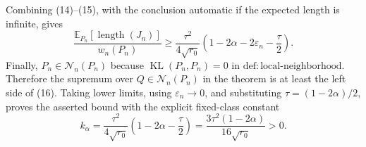Combining (14)--(15), with the conclusion automatic if the expected length is infinite, gives
\[
\frac{\mathbb E_{P_n}[\operatorname{length}(J_n)]}{w_n(P_n)}
\geq
\frac{\tau^2}{4\sqrt{r_0}}
\left(1-2\alpha-2\varepsilon_n-\frac\tau2\right). \tag{16}
\]
Finally, \(P_n\in\mathcal N_n(P_n)\) because \(\operatorname{KL}(P_n,P_n)=0\) in \(\mathrm{def{:}local\mbox{-}neighborhood}\).  Therefore the supremum over \(Q\in\mathcal N_n(P_n)\) in the theorem is at least the left side of (16).  Taking lower limits, using \(\varepsilon_n\to0\), and substituting \(\tau=(1-2\alpha)/2\), proves the asserted bound with the explicit fixed-class constant
\[
k_\alpha
=\frac{\tau^2}{4\sqrt{r_0}}
\left(1-2\alpha-\frac\tau2\right)
=\frac{3\tau^2(1-2\alpha)}{16\sqrt{r_0}}>0.
\]
